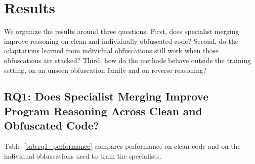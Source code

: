 \section{Results}
\label{sec:results}

We organize the results around three questions. First, does specialist merging
improve reasoning on clean and individually obfuscated code? Second, do the
adaptations learned from individual obfuscations still work when those
obfuscations are stacked? Third, how do the methods behave outside the training
setting, on an unseen obfuscation family and on reverse reasoning?



\subsection{RQ1: Does Specialist Merging Improve Program Reasoning Across
Clean and Obfuscated Code?}
\label{sec:rq1}

Table~\ref{tab:rq1_performance} compares performance on clean code and on the
individual obfuscations used to train the specialists.

